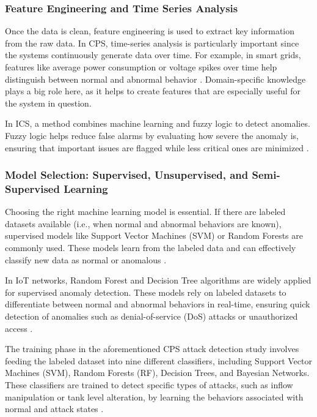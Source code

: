 \subsubsection{Feature Engineering and Time Series Analysis}

Once the data is clean, feature engineering is used to extract key information from the raw data. In CPS, time-series analysis is particularly important since the systems continuously generate data over time. For example, in smart grids, features like average power consumption or voltage spikes over time help distinguish between normal and abnormal behavior \cite{44, 66}. Domain-specific knowledge plays a big role here, as it helps to create features that are especially useful for the system in question.

In ICS, a method combines machine learning and fuzzy logic to detect anomalies. Fuzzy logic helps reduce false alarms by evaluating how severe the anomaly is, ensuring that important issues are flagged while less critical ones are minimized \cite{89}.

\subsubsection{Model Selection: Supervised, Unsupervised, and Semi-Supervised Learning}

Choosing the right machine learning model is essential. If there are labeled datasets available (i.e., when normal and abnormal behaviors are known), supervised models like Support Vector Machines (SVM) or Random Forests are commonly used. These models learn from the labeled data and can effectively classify new data as normal or anomalous \cite{85}.

In IoT networks, Random Forest and Decision Tree algorithms are widely applied for supervised anomaly detection. These models rely on labeled datasets to differentiate between normal and abnormal behaviors in real-time, ensuring quick detection of anomalies such as denial-of-service (DoS) attacks or unauthorized access \cite{84}.

The training phase in the aforementioned CPS attack detection study involves feeding the labeled dataset into nine different classifiers, including Support Vector Machines (SVM), Random Forests (RF), Decision Trees, and Bayesian Networks. These classifiers are trained to detect specific types of attacks, such as inflow manipulation or tank level alteration, by learning the behaviors associated with normal and attack states \cite{92}.

